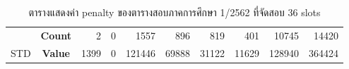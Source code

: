 \begin{table}[]
{\begin{tabular}{@{}ccrrrrrrrr@{}}
    {\color[HTML]{FE0000} }                      & {\color[HTML]{FE0000} \textbf{Count}} & {\color[HTML]{FE0000} 2}       & {\color[HTML]{FE0000} 0}       & {\color[HTML]{FE0000} 1557}    & {\color[HTML]{FE0000} 896}     & {\color[HTML]{FE0000} 819}     & {\color[HTML]{FE0000} 401}     & {\color[HTML]{FE0000} 10745}   & {\color[HTML]{FE0000} 14420}     \\ \cmidrule(l){2-10} 
    \multirow{-2}{*}{{\color[HTML]{FE0000} STD}} & {\color[HTML]{FE0000} \textbf{Value}} & {\color[HTML]{FE0000} 1399}    & {\color[HTML]{FE0000} 0}       & {\color[HTML]{FE0000} 121446}  & {\color[HTML]{FE0000} 69888}   & {\color[HTML]{FE0000} 31122}   & {\color[HTML]{FE0000} 11629}   & {\color[HTML]{FE0000} 128940}  & {\color[HTML]{FE0000} 364424}    \\ \bottomrule
    \end{tabular}%
    }
    \caption{ตารางแสดงค่า penalty ของตารางสอบภาคการศึกษา 1/2562 ที่จัดสอบ 36 slots}
    \label{tab:result_table_162_36}
\end{table}
